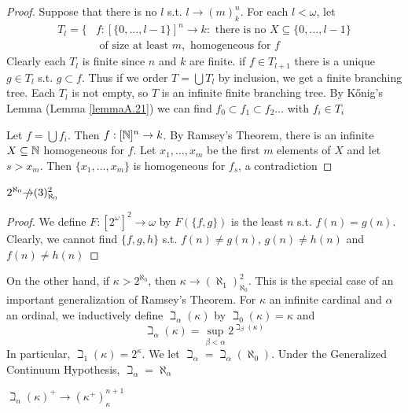 \documentclass[11pt]{article}
\begin{document}
\begin{proof}
Suppose that there is no \(l\) s.t. \(l\to (m)_k^n\). For each \(l<\omega\),
let
\begin{align*}
T_l=\{&f:[\{0,\dots,l-1\}]^n\to k:\text{ there is no }X\subseteq\{0,\dots,l-1\}\\
&\text{ of size at least }m, \text{ homogeneous for }f
\end{align*}
Clearly each \(T_l\) is finite since \(n\) and \(k\) are finite. if \(f\in T_{l+1}\) there is a
unique \(g\in T_l\) s.t. \(g\subset f\). Thus if we order \(T=\bigcup T_l\) by inclusion, we get a finite
branching tree. Each \(T_l\) is not empty, so \(T\) is an infinite finite branching tree. By
Kőnig's Lemma (Lemma \ref{lemmaA.21}) we can find \(f_0\subset f_1\subset f_2\dots\) with \(f_i\in T_i\)

Let \(f=\bigcup f_i\). Then \(f:[\mathbb{N}]^n\to k\). By Ramsey's Theorem, there is an infinite \(X\subseteq\mathbb{N}\)
homogeneous for \(f\). Let \(x_1,\dots,x_m\) be the first \(m\) elements of \(X\) and let \(s>x_m\).
Then \(\{x_1,\dots,x_m\}\) is homogeneous for \(f_s\), a contradiction
\end{proof}

\begin{proposition}[]
\(2^{\aleph_0}\slashed{\to}(3)^2_{\aleph_0}\)
\end{proposition}

\begin{proof}
We define \(F:[2^\omega]^2\to\omega\) by \(F(\{f,g\})\) is the least \(n\) s.t. \(f(n)=g(n)\). Clearly, we
cannot find \(\{f,g,h\}\) s.t. \(f(n)\neq g(n)\), \(g(n)\neq h(n)\) and \(f(n)\neq h(n)\)
\end{proof}

On the other hand, if \(\kappa>2^{\aleph_0}\), then \(\kappa\to(\aleph_1)_{\aleph_0}^2\). This is the special case of an
important generalization of Ramsey's Theorem. For \(\kappa\) an infinite cardinal and \(\alpha\) an ordinal, we
inductively define \(\beth_\alpha(\kappa)\) by \(\beth_0(\kappa)=\kappa\) and
\begin{equation*}
\beth_\alpha(\kappa)=\sup_{\beta<\alpha}2^{\beth_\beta(\kappa)}
\end{equation*}
In particular, \(\beth_1(\kappa)=2^\kappa\). We let \(\beth_\alpha=\beth_\alpha(\aleph_0)\). Under the Generalized Continuum
Hypothesis, \(\beth_\alpha=\aleph_\alpha\)

\begin{theorem}
\(\beth_n(\kappa)^+\to(\kappa^+)_\kappa^{n+1}\)
\end{theorem}
\end{document}
